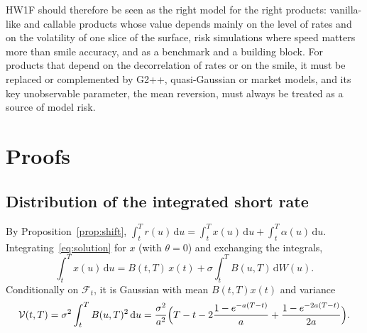 \documentclass[11pt,a4paper]{article}
\theoremstyle{plain}
\theoremstyle{definition}
\newcommand{\dd}{\mathrm{d}}
\newcommand{\F}{\mathcal{F}}
\begin{document}
HW1F should therefore be seen as the right model for the right products: vanilla-like and callable products whose value depends mainly on the level of rates and on the volatility of one slice of the surface, risk simulations where speed matters more than smile accuracy, and as a benchmark and a building block. For products that depend on the decorrelation of rates or on the smile, it must be replaced or complemented by G2++, quasi-Gaussian or market models, and its key unobservable parameter, the mean reversion, must always be treated as a source of model risk.

\clearpage
\appendix
\section{Proofs}
\label{app:proofs}

\subsection{Distribution of the integrated short rate}
By Proposition~\ref{prop:shift}, $\int_t^Tr(u)\,\dd u=\int_t^Tx(u)\,\dd u+\int_t^T\alpha(u)\,\dd u$. Integrating~\eqref{eq:solution} for $x$ (with $\theta=0$) and exchanging the integrals,
\begin{equation}
    \int_t^Tx(u)\,\dd u=B(t,T)\,x(t)+\sigma\int_t^TB(u,T)\,\dd W(u).
\end{equation}
Conditionally on $\F_t$, it is Gaussian with mean $B(t,T)x(t)$ and variance
\begin{equation}
    \mathcal{V}(t,T)=\sigma^2\int_t^TB(u,T)^2\,\dd u=\frac{\sigma^2}{a^2}\Bigl(T-t-2\frac{1-e^{-a(T-t)}}{a}+\frac{1-e^{-2a(T-t)}}{2a}\Bigr).
    \label{eq:calV}
\end{equation}
\end{document}
